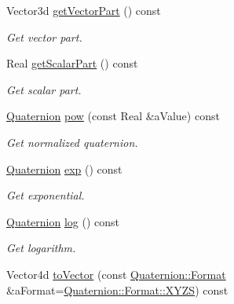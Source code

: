 \begin{DoxyCompactItemize}
Vector3d \hyperlink{classlibrary_1_1math_1_1geom_1_1d3_1_1trf_1_1rot_1_1_quaternion_a5a00c3e85f0736ade6d887285afa16f9}{get\+Vector\+Part} () const
\begin{DoxyCompactList}\small\item\em Get vector part. \end{DoxyCompactList}\item 
Real \hyperlink{classlibrary_1_1math_1_1geom_1_1d3_1_1trf_1_1rot_1_1_quaternion_a12376aa1c1f32800a14dc1939316a5ec}{get\+Scalar\+Part} () const
\begin{DoxyCompactList}\small\item\em Get scalar part. \end{DoxyCompactList}\item 
\hyperlink{classlibrary_1_1math_1_1geom_1_1d3_1_1trf_1_1rot_1_1_quaternion}{Quaternion} \hyperlink{classlibrary_1_1math_1_1geom_1_1d3_1_1trf_1_1rot_1_1_quaternion_ac04ce4d592fff9225fcc2947886218a1}{pow} (const Real \&a\+Value) const
\begin{DoxyCompactList}\small\item\em Get normalized quaternion. \end{DoxyCompactList}\item 
\hyperlink{classlibrary_1_1math_1_1geom_1_1d3_1_1trf_1_1rot_1_1_quaternion}{Quaternion} \hyperlink{classlibrary_1_1math_1_1geom_1_1d3_1_1trf_1_1rot_1_1_quaternion_a6a5dda4ec1d00646bdda2bb9b00bc94c}{exp} () const
\begin{DoxyCompactList}\small\item\em Get exponential. \end{DoxyCompactList}\item 
\hyperlink{classlibrary_1_1math_1_1geom_1_1d3_1_1trf_1_1rot_1_1_quaternion}{Quaternion} \hyperlink{classlibrary_1_1math_1_1geom_1_1d3_1_1trf_1_1rot_1_1_quaternion_aa0127106b33fa0397b3b678ae143c21b}{log} () const
\begin{DoxyCompactList}\small\item\em Get logarithm. \end{DoxyCompactList}\item 
Vector4d \hyperlink{classlibrary_1_1math_1_1geom_1_1d3_1_1trf_1_1rot_1_1_quaternion_afc18082a537f4b6a7dbb151603963d19}{to\+Vector} (const \hyperlink{classlibrary_1_1math_1_1geom_1_1d3_1_1trf_1_1rot_1_1_quaternion_aa86c54f6157891b2f1a517c672d6deec}{Quaternion\+::\+Format} \&a\+Format=\hyperlink{classlibrary_1_1math_1_1geom_1_1d3_1_1trf_1_1rot_1_1_quaternion_aa86c54f6157891b2f1a517c672d6deeca11c51ecd5dc6f86ba3c1ae79e21482f5}{Quaternion\+::\+Format\+::\+X\+Y\+ZS}) const

\end{DoxyCompactItemize}
